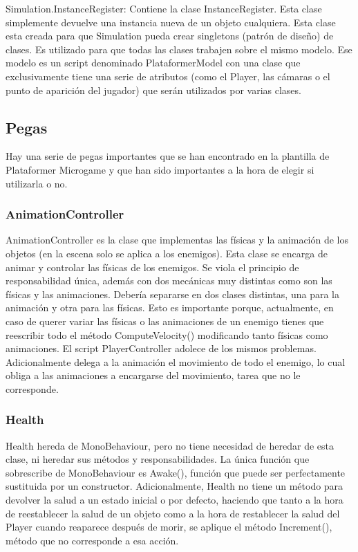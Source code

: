 Simulation.InstanceRegister: Contiene la clase InstanceRegister. Esta clase simplemente devuelve una instancia nueva de un objeto cualquiera. Esta clase esta creada para que Simulation pueda crear singletons (patrón de diseño) de clases. Es utilizado para que todas las clases trabajen sobre el mismo modelo. Ese modelo es un script denominado PlataformerModel con una clase que exclusivamente tiene una serie de atributos (como el Player, las cámaras o el punto de aparición del jugador) que serán utilizados por varias clases.

\subsection{Pegas}
Hay una serie de pegas importantes que se han encontrado en la plantilla de Plataformer Microgame y que han sido importantes a la hora de elegir si utilizarla o no.

\subsubsection{AnimationController}
AnimationController es la clase que implementas las físicas y la animación de los objetos (en la escena solo se aplica a los enemigos).
Esta clase se encarga de animar y controlar las físicas de los enemigos. Se viola el principio de responsabilidad única, además con dos mecánicas muy distintas como son las físicas y las animaciones. Debería separarse en dos clases distintas, una para la animación y otra para las físicas. Esto es importante porque, actualmente, en caso de querer variar las físicas o las animaciones de un enemigo tienes que reescribir todo el método ComputeVelocity() modificando tanto físicas como animaciones. El script PlayerController adolece de los mismos problemas. 
Adicionalmente delega a la animación el movimiento de todo el enemigo, lo cual obliga a las animaciones a encargarse del movimiento, tarea que no le corresponde.

\subsubsection{Health}
Health hereda de MonoBehaviour, pero no tiene necesidad de heredar de esta clase, ni heredar sus métodos y responsabilidades. La única función que sobrescribe de MonoBehaviour es Awake(), función que puede ser perfectamente sustituida por un constructor. Adicionalmente, Health no tiene un método para devolver la salud a un estado inicial o por defecto, haciendo que tanto a la hora de reestablecer la salud de un objeto como a la hora de restablecer la salud del Player cuando reaparece después de morir, se aplique el método Increment(), método que no corresponde a esa acción.

